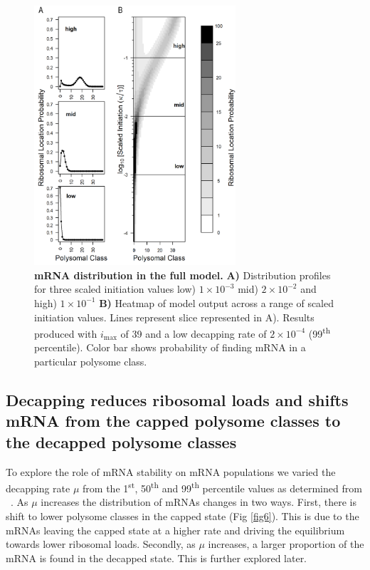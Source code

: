 \documentclass[10pt,letterpaper]{article}
\newcommand{\imax}{\ensuremath{{i_{\max}}}\xspace}
\begin{document}
\begin{figure}[!h]
\begin{center}
\includegraphics[width=75mm]{Images/2023-07-09_Figure1_DIIvsDDI_medianlength_low_marking_with_labels.png}
\caption{{\bf mRNA distribution in the full model.} {\bf A)} Distribution profiles for three scaled initiation values low) $1\times 10^{-3}$ mid) $2\times 10^{-2}$ and high) $1\times 10^{-1}$ {\bf B)} Heatmap of model output across a range of scaled initiation values. Lines represent slice represented in A). Results produced with \imax of 39 and a low decapping rate of $2\times10^{-4}$  (99\textsuperscript{th} percentile). Color bar shows probability of finding mRNA in a particular polysome class.}
\label{fig5}
\end{center}
\end{figure}


\subsection*{Decapping reduces ribosomal loads and shifts mRNA from the capped polysome classes to the decapped polysome classes}

To explore the role of mRNA stability on mRNA populations we varied the decapping rate $\mu$ from the 1\textsuperscript{st}, 50\textsuperscript{th} and 99\textsuperscript{th} percentile values as determined from ~\cite{RN27}.
As $\mu$ increases the distribution of mRNAs changes in two ways. 
First, there is shift to lower polysome classes in the capped state (Fig \ref{fig6}).
This is due to the mRNAs leaving the capped state at a higher rate and driving the equilibrium towards lower ribosomal loads. 
Secondly, as $\mu$ increases, a larger proportion of the mRNA is found in the decapped state. This is further explored later. 
\end{document}
